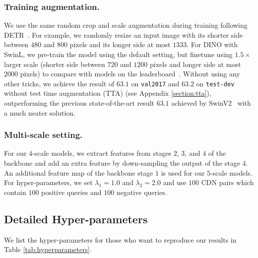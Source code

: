 \documentclass[runningheads]{llncs}
\begin{document}
\subsubsection{Training augmentation.}
We use the same random crop and scale augmentation during training following DETR~\cite{carion2020end}. For example, we randomly resize an input image with its shorter side between $480$ and $800$ pixels and its longer side at most $1333$. For DINO with SwinL, we pre-train the model using the default setting, but finetune using $1.5\times$ larger scale (shorter side between $720$ and $1200$ pixels and longer side at most $2000$ pixels) to compare with models on the leaderboard~\cite{paperwithcode}. Without using any other tricks, we achieve the result of $63.1$ on \texttt{val2017} and $63.2$ on \texttt{test-dev} without test time augmentation (TTA) (see Appendix \ref{section:tta}), outperforming  the previous state-of-the-art result $63.1$ achieved by SwinV2~\cite{liu2021swinv2} with a much neater solution. 

\subsubsection{Multi-scale setting.}
For our $4$-scale models, we extract features from stages $2$, $3$, and $4$ of the backbone and add an extra feature by down-sampling the output of the stage $4$. An additional feature map of the backbone stage $1$ is used for our $5$-scale models.
For hyper-parameters, we set $\lambda_1=1.0$ and $\lambda_2=2.0$ and use $100$ CDN pairs which contain $100$ positive queries and $100$ negative queries.
\subsection{Detailed Hyper-parameters}
We list the hyper-parameters for those who want to reproduce our results in Table \ref{tab:hyperparameters}.
\end{document}
